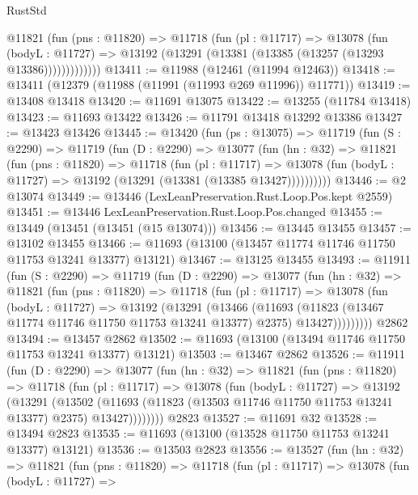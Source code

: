 \begin{lexlean}{RustStd}
\begin{coremodule}
            @11821
              (fun (pns : @11820) =>
              @11718
                (fun (pl : @11717) =>
                @13078
                  (fun (bodyL : @11727) =>
                  @13192 (@13291 (@13381 (@13385 (@13257 (@13293 @13386)))))))))))))
@13411 := @11988 (@12461 (@11994 @12463))
@13418 := @13411 (@12379 (@11988 (@11991 (@11993 @269 @11996)) @11771))
@13419 := @13408 @13418
@13420 := @11691 @13075
@13422 := @13255 (@11784 @13418)
@13423 := @11693 @13422
@13426 := @11791 @13418 @13292 @13386
@13427 := @13423 @13426
@13445 := @13420
    (fun (ps : @13075) =>
    @11719
      (fun (S : @2290) =>
      @11719
        (fun (D : @2290) =>
        @13077
          (fun (hn : @32) =>
          @11821
            (fun (pns : @11820) =>
            @11718
              (fun (pl : @11717) =>
              @13078 (fun (bodyL : @11727) => @13192 (@13291 (@13381 (@13385 @13427))))))))))
@13446 := @2 @13074
@13449 := @13446 (LexLeanPreservation.Rust.Loop.Pos.kept @2559)
@13451 := @13446 LexLeanPreservation.Rust.Loop.Pos.changed
@13455 := @13449 (@13451 (@13451 (@15 @13074)))
@13456 := @13445 @13455
@13457 := @13102 @13455
@13466 := @11693 (@13100 (@13457 @11774 @11746 @11750 @11753 @13241 @13377) @13121)
@13467 := @13125 @13455
@13493 := @11911
    (fun (S : @2290) =>
    @11719
      (fun (D : @2290) =>
      @13077
        (fun (hn : @32) =>
        @11821
          (fun (pns : @11820) =>
          @11718
            (fun (pl : @11717) =>
            @13078
              (fun (bodyL : @11727) =>
              @13192
                (@13291
                  (@13466
                    (@11693
                      (@11823 (@13467 @11774 @11746 @11750 @11753 @13241 @13377) @2375)
                      @13427)))))))))
    @2862
@13494 := @13457 @2862
@13502 := @11693 (@13100 (@13494 @11746 @11750 @11753 @13241 @13377) @13121)
@13503 := @13467 @2862
@13526 := @11911
    (fun (D : @2290) =>
    @13077
      (fun (hn : @32) =>
      @11821
        (fun (pns : @11820) =>
        @11718
          (fun (pl : @11717) =>
          @13078
            (fun (bodyL : @11727) =>
            @13192
              (@13291
                (@13502
                  (@11693 (@11823 (@13503 @11746 @11750 @11753 @13241 @13377) @2375) @13427))))))))
    @2823
@13527 := @11691 @32
@13528 := @13494 @2823
@13535 := @11693 (@13100 (@13528 @11750 @11753 @13241 @13377) @13121)
@13536 := @13503 @2823
@13556 := @13527
    (fun (hn : @32) =>
    @11821
      (fun (pns : @11820) =>
      @11718
        (fun (pl : @11717) =>
        @13078
          (fun (bodyL : @11727) =>

\end{coremodule}
\end{lexlean}
